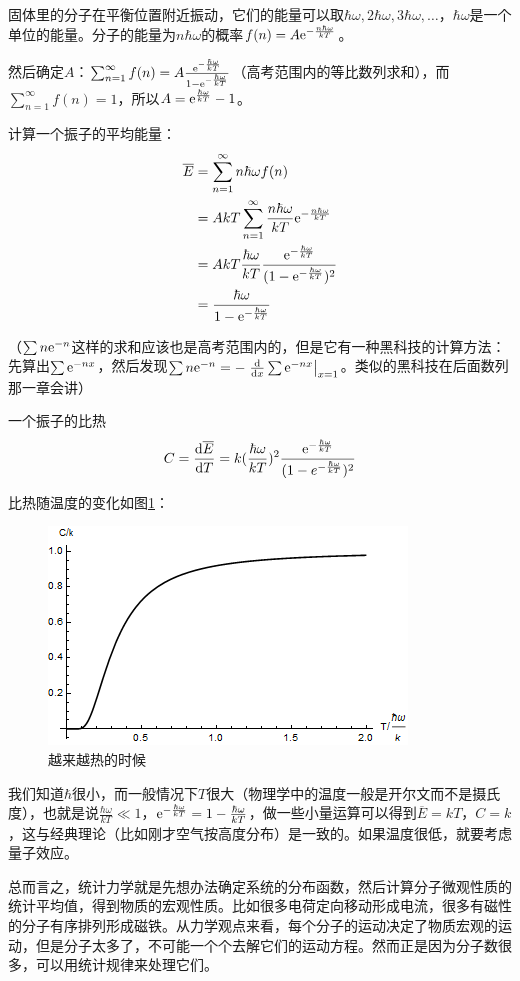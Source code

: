 固体里的分子在平衡位置附近振动，它们的能量可以取$\hbar \omega,2 \hbar \omega,3 \hbar \omega,\dots$，$\hbar \omega$是一个单位的能量。分子的能量为$n \hbar \omega$的概率$f(n)=A \mathrm{e}^{-\frac{n \hbar \omega}{k T}}$。

然后确定$A$：$\sum_{n=1}^\infty f(n)=A \frac{\mathrm{e}^{-\frac{\hbar \omega}{k T}}}{1-\mathrm{e}^{-\frac{\hbar \omega}{k T}}}$（高考范围内的等比数列求和），而$\sum_{n=1}^\infty f(n)=1$，所以$A=\mathrm{e}^{\frac{\hbar \omega}{k T}}-1$。

计算一个振子的平均能量：
\begin{align*}
\overline{E}&=\sum_{n=1}^\infty n \hbar \omega f(n) \\
&=A k T \sum_{n=1}^\infty \frac{n \hbar \omega}{k T} \mathrm{e}^{-\frac{n \hbar \omega}{k T}} \\
&=A k T \frac{\hbar \omega}{k T} \frac{\mathrm{e}^{-\frac{\hbar \omega}{k T}}}{(1-\mathrm{e}^{-\frac{\hbar \omega}{k T}})^2} \\
&=\frac{\hbar \omega}{1-\mathrm{e}^{-\frac{\hbar \omega}{k T}}}
\end{align*}

（$\sum n \mathrm{e}^{-n}$这样的求和应该也是高考范围内的，但是它有一种黑科技的计算方法：先算出$\sum \mathrm{e}^{-n x}$，然后发现$\sum n \mathrm{e}^{-n}=-\left. \frac{\mathop{}\!\mathrm{d}}{\mathop{}\!\mathrm{d} x} \sum \mathrm{e}^{-n x} \right|_{x=1}$。类似的黑科技在后面数列那一章会讲）

一个振子的比热
\begin{equation*}
C=\frac{\mathop{}\!\mathrm{d} \overline{E}}{\mathop{}\!\mathrm{d} T}=k (\frac{\hbar \omega}{k T})^2 \frac{\mathrm{e}^{-\frac{\hbar \omega}{k T}}}{(1-e^{-\frac{\hbar \omega}{k T}})^2}
\end{equation*}

比热随温度的变化如图\ref{fig-quant-osc-c}：
\begin{figure}[htb]
\centering
\includegraphics[scale=0.5]{fig/quant-osc-c.png}
\caption{越来越热的时候}
\label{fig-quant-osc-c}
\end{figure}

我们知道$\hbar$很小，而一般情况下$T$很大（物理学中的温度一般是开尔文而不是摄氏度），也就是说$\frac{\hbar \omega}{k T} \ll 1$，$\mathrm{e}^{-\frac{\hbar \omega}{k T}}=1-\frac{\hbar \omega}{k T}$，做一些小量运算可以得到$\overline{E}=k T$，$C=k$，这与经典理论（比如刚才空气按高度分布）是一致的。如果温度很低，就要考虑量子效应。

总而言之，统计力学就是先想办法确定系统的分布函数，然后计算分子微观性质的统计平均值，得到物质的宏观性质。比如很多电荷定向移动形成电流，很多有磁性的分子有序排列形成磁铁。从力学观点来看，每个分子的运动决定了物质宏观的运动，但是分子太多了，不可能一个个去解它们的运动方程。然而正是因为分子数很多，可以用统计规律来处理它们。
